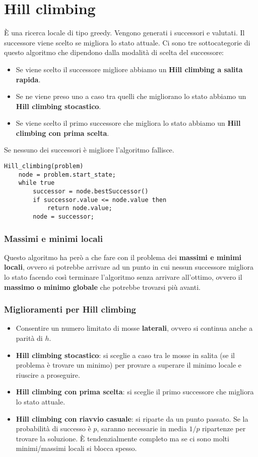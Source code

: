 \section{Hill climbing}
\`E una ricerca locale di tipo greedy. Vengono generati i successori e valutati. Il successore
viene scelto se migliora lo stato attuale. Ci sono tre sottocategorie di questo algoritmo che
dipendono dalla modalit\`a di scelta del successore:
\begin{itemize}
	\item Se viene scelto il successore migliore abbiamo un \textbf{Hill climbing a salita rapida}.
	\item Se ne viene preso uno a caso tra quelli che migliorano lo stato abbiamo un
	      \textbf{Hill climbing stocastico}.
	\item Se viene scelto il primo successore che migliora lo stato abbiamo un
	      \textbf{Hill climbing con prima scelta}.
\end{itemize}
Se nessuno dei successori \`e migliore l'algoritmo fallisce.

\begin{lstlisting}[style=pseudo-style]
Hill_climbing(problem)
	node = problem.start_state;
	while true
		successor = node.bestSuccessor()
		if successor.value <= node.value then
			return node.value;
		node = successor;
\end{lstlisting}

\subsubsection{Massimi e minimi locali}
Questo algoritmo ha per\`o a che fare con il problema dei \textbf{massimi e minimi locali}, ovvero
si potrebbe arrivare ad un punto in cui nessun successore migliora lo stato facendo cos\`i terminare
l'algoritmo senza arrivare all'ottimo, ovvero il \textbf{massimo o minimo globale} che potrebbe
trovarsi pi\`u avanti.

\subsubsection{Miglioramenti per Hill climbing}
\begin{itemize}
	\item Consentire un numero limitato di mosse \textbf{laterali}, ovvero si continua anche
	      a parit\`a di $h$.
	\item \textbf{Hill climbing stocastico}: si sceglie a caso tra le mosse in salita (se il problema
	      \`e trovare un minimo) per provare a superare il minimo locale e riuscire a proseguire.
	\item \textbf{Hill climbing con prima scelta}: si sceglie il primo successore che migliora lo stato
	      attuale.
	\item \textbf{Hill climbing con riavvio casuale}: si riparte da un punto passato. Se la probabilit\`a
	      di successo \`e $p$, saranno necessarie in media $1 / p$ ripartenze per trovare la soluzione.
	      \`E tendenzialmente completo ma se ci sono molti minimi/massimi locali si blocca spesso.
\end{itemize}

